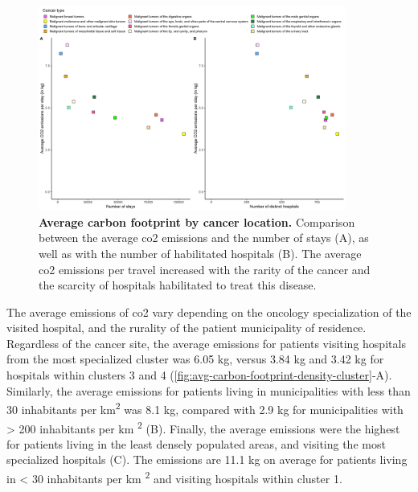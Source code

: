 \begin{figure}[h!]
    \includegraphics[width=0.9\textwidth]{images/routes/sup_fig_4.png}
    \centering
    \caption{ \textbf{Average carbon footprint by cancer location.} Comparison
        between the average \ac{co2} emissions and the number of stays (A), as
        well as with the number of habilitated hospitals (B). The average
        \ac{co2} emissions per travel increased with the rarity of the cancer
        and the scarcity of hospitals habilitated to treat this disease. }
    \label{fig:avg-carbon-footprint-pathology}
\end{figure}

The average emissions of \ac{co2} vary depending on the oncology specialization
of the visited hospital, and the rurality of the patient municipality of
residence. Regardless of the cancer site, the average emissions for patients
visiting hospitals from the most specialized cluster was 6.05 kg, versus 3.84 kg
and 3.42 kg for hospitals within clusters 3 and 4
(\cref{fig:avg-carbon-footprint-density-cluster}-A). Similarly, the average
emissions for patients living in municipalities with less than 30 inhabitants
per km\textsuperscript{2} was 8.1 kg, compared with 2.9 kg for municipalities
with > 200 inhabitants per km \textsuperscript{2}
(B). Finally, the average emissions were the highest for patients living
in the least densely populated areas, and visiting the most specialized
hospitals (C). The emissions are 11.1 kg on average for patients living in
< 30 inhabitants per km \textsuperscript{2} and visiting hospitals within
cluster 1.

